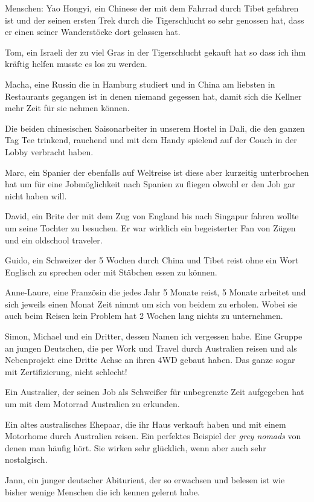 \documentclass[11pt]{book}
\begin{document}
Menschen:
Yao Hongyi, ein Chinese der mit dem Fahrrad durch Tibet gefahren ist und der seinen ersten Trek durch die Tigerschlucht so sehr 
genossen hat, dass er einen seiner Wanderstöcke dort gelassen hat.

Tom, ein Israeli der zu viel Gras in der Tigerschlucht gekauft hat so dass ich ihm kräftig helfen musste es los zu werden.

Macha, eine Russin die in Hamburg studiert und in China am liebsten in Restaurants gegangen ist in denen niemand gegessen hat, damit sich 
die Kellner mehr Zeit für sie nehmen können.

Die beiden chinesischen Saisonarbeiter in unserem Hostel in Dali, die den ganzen Tag Tee trinkend, rauchend und mit dem Handy spielend 
auf der Couch in der Lobby verbracht haben.

Marc, ein Spanier der ebenfalls auf Weltreise ist diese aber kurzeitig unterbrochen hat um für eine Jobmöglichkeit nach Spanien zu fliegen 
obwohl er den Job gar nicht haben will.

David, ein Brite der mit dem Zug von England bis nach Singapur fahren wollte um seine Tochter zu besuchen. Er war wirklich ein begeisterter
Fan von Zügen und ein oldschool traveler.

Guido, ein Schweizer der 5 Wochen durch China und Tibet reist ohne ein Wort Englisch zu sprechen oder mit Stäbchen essen zu können.

Anne-Laure, eine Französin die jedes Jahr 5 Monate reist, 5 Monate arbeitet und sich jeweils einen Monat Zeit nimmt um sich von beidem 
zu erholen. Wobei sie auch beim Reisen kein Problem hat 2 Wochen lang nichts zu unternehmen.

Simon, Michael und ein Dritter, dessen Namen ich vergessen habe. Eine Gruppe an jungen Deutschen, die per Work und Travel durch 
Australien reisen und als Nebenprojekt eine Dritte Achse an ihren 4WD gebaut haben. Das ganze sogar mit Zertifizierung, nicht schlecht!

Ein Australier, der seinen Job als Schweißer für unbegrenzte Zeit aufgegeben hat um mit dem Motorrad Australien zu erkunden.

Ein altes australisches Ehepaar, die ihr Haus verkauft haben und mit einem Motorhome durch Australien reisen. Ein perfektes 
Beispiel der \emph{grey nomads} von denen man häufig hört. Sie wirken sehr glücklich, wenn aber auch sehr nostalgisch.

Jann, ein junger deutscher Abiturient, der so erwachsen und belesen ist wie bisher wenige Menschen die ich kennen gelernt habe.
\end{document}
